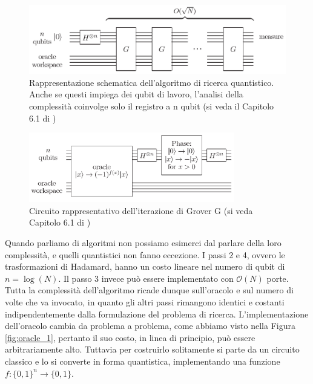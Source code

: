\documentclass{book}
\theoremstyle{definition}
\theoremstyle{definition}
\theoremstyle{definition}
\theoremstyle{plain}
\theoremstyle{plain}
\theoremstyle{plain}
\theoremstyle{plain}
\begin{document}
\begin{figure}[h!]
\captionsetup{font=scriptsize}
\begin{center}
    \includegraphics[width=1\textwidth]{img_grover_0.png}
\end{center}
\caption{\scriptsize Rappresentazione schematica dell'algoritmo di ricerca quantistico. Anche se questi impiega dei qubit di lavoro, l'analisi della complessità coinvolge solo il registro a n qubit (si veda il Capitolo 6.1 di \cite{nielsen_chuang})}\label{fig:img_grover_0}
\end{figure} 
\begin{figure}[h!]
\captionsetup{font=scriptsize}
\begin{center}
    \includegraphics[width=0.80\textwidth]{img_grover_1.png}
\end{center}
\caption{\scriptsize Circuito rappresentativo dell'iterazione di Grover G (si veda Capitolo 6.1 di \cite{nielsen_chuang})}\label{fig:img_grover_1}
\end{figure}
\noindent Quando parliamo di algoritmi non possiamo esimerci dal parlare della loro complessità, e quelli quantistici non fanno eccezione. I passi 2 e 4, ovvero le trasformazioni di Hadamard, hanno un costo lineare nel numero di qubit di $n = \log{(N)}$. Il passo 3 invece può essere implementato con $\mathcal{O}(N)$ porte. Tutta la complessità dell'algoritmo ricade dunque sull'oracolo e sul numero di volte che va invocato, in quanto gli altri passi rimangono identici e costanti indipendentemente dalla formulazione del problema di ricerca. L'implementazione dell'oracolo cambia da problema a problema, come abbiamo visto nella Figura \ref{fig:oracle_1}, pertanto il suo costo, in linea di principio, può essere arbitrariamente alto. Tuttavia per costruirlo solitamente si parte da un circuito classico e lo si converte in forma quantistica, implementando una funzione $f:\{0, 1\}^{n} \rightarrow \{0, 1\}$.
\end{document}
